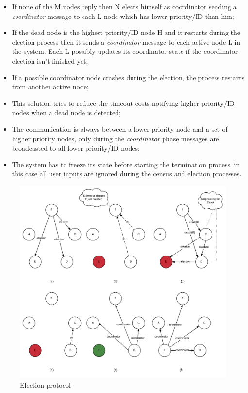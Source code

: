\begin{itemize}
  \item If none of the M nodes reply then N elects himself as coordinator sending a \textit{coordinator} message to each L node which has lower priority/ID than him;
  \item If the dead node is the highest priority/ID node H and it restarts during the election process then it sends a \textit{coordinator} message to each active node L in the system. Each L possibly updates its coordinator state if the coordinator election isn't finished yet;
  \item If a possible coordinator node crashes during the election, the process restarts from another active node;
  \item This solution tries to reduce the timeout costs notifying higher priority/ID nodes when a dead node is detected;
  \item The communication is always between a lower priority node and a set of higher priority nodes, only during the \textit{coordinator} phase messages are broadcasted to all lower priority/ID nodes;
  \item The system has to freeze its state before starting the termination process, in this case all user inputs are ignored during the census and election processes.
\end{itemize}

\begin{figure}[H]
  \centering
  \includegraphics[width=\columnwidth]{sections/images/solution/election.pdf}
  \caption{Election protocol}
  \label{fig:election-protocol}
\end{figure}

